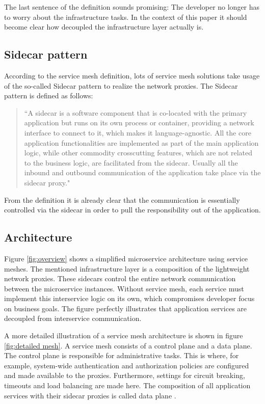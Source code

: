 The last sentence of the definition sounds promising: The developer no longer has to worry about the infrastructure tasks. In the context of this paper it should become clear how decoupled the infrastructure layer actually is.

\subsection{Sidecar pattern}

According to the service mesh definition, lots of service mesh solutions take usage of the so-called Sidecar pattern to realize the network proxies. The Sidecar pattern is defined as follows:

\begin{quote}
``A sidecar is a software component that is co-located with 
the primary application but runs on its own process or container, providing 
a network interface to connect to it, which makes it language-agnostic. All 
the core application functionalities are implemented as part of the main 
application logic, while other commodity crosscutting features, which are not related to the business logic, are facilitated from the sidecar. Usually all the inbound and outbound communication of the application take place via the sidecar proxy." \cite[p. 266]{sm3}
\end{quote}

From the definition it is already clear that the communication is essentially controlled via the sidecar in order to pull the responsibility out of the application.

\subsection{Architecture}
\label{chap:mesh-architecture}

Figure \ref{fig:overview} shows a simplified microservice architecture using service meshes. The mentioned infrastructure layer is a composition of the lightweight network proxies. These sidecars control the entire network communication between the microservice instances. Without service mesh, each service must implement this interservice logic on its own, which compromises developer focus on business goals. The figure perfectly illustrates that application services are decoupled from interservice communication.

A more detailed illustration of a service mesh architecture is shown in figure \ref{fig:detailed mesh}. A service mesh consists of a control plane and a data plane.
The control plane is responsible for administrative tasks. This is where, for example, system-wide authentication and authorization policies are configured and made available to the proxies. Furthermore, settings for circuit breaking, timeouts and load balancing are made here. The composition of all application services with their sidecar proxies is called data plane \cite{sm4}.

